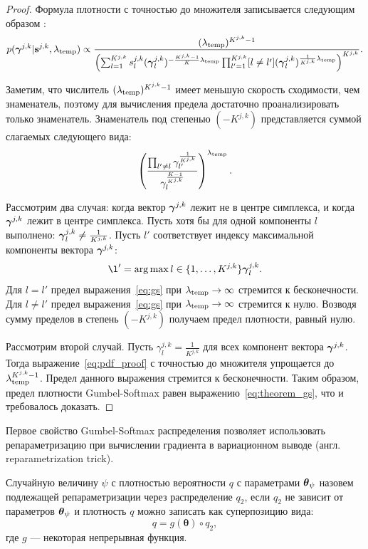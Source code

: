 \begin{proof} 
Формула плотности с точностью до множителя записывается следующим образом :
\begin{equation}
\label{eq:pdf_proof}
    p(\boldsymbol{\gamma}^{j,k}|\mathbf{s}^{j,k}, \lambda_{\text{temp}}) \propto    \frac{(\lambda_{\text{temp}})^{K^{j,k}-1}}{\left(\sum_{l=1}^{K^{j,k}} s^{j,k}_l(\boldsymbol{\gamma}^{j,k}_l)^{-\frac{K^{j,k}-1}{K}\lambda_{\text{temp}}}\prod_{l'=1}^{K^{j,k}} [l \neq l'](\boldsymbol{\gamma}_l^{j,k})^{\frac{1}{K^{j,k}}\lambda_{\text{temp}}}\right)^{K^{j,k}}}.
\end{equation}

Заметим, что числитель $(\lambda_{\text{temp}})^{K^{j,k}-1}$ имеет меньшую скорость сходимости, чем знаменатель, поэтому для вычисления предела достаточно проанализировать только знаменатель. Знаменатель под степенью $(-K^{j,k})$ представляется суммой слагаемых следующего вида: 
\begin{equation}
\label{eq:gs}
    \left(\frac{\prod_{l' \neq l} \gamma_{l'}^{\frac{1}{K^{j,k}}}}{\gamma_l^{\frac{K-1}{K^{j,k}}}}\right)^{\lambda_{\text{temp}}}.
\end{equation}

Рассмотрим два случая: когда вектор $\boldsymbol{\gamma}^{j,k}$  лежит не в центре симплекса, и когда  $\boldsymbol{\gamma}^{j,k}$ лежит в центре симплекса. 
Пусть хотя бы для одной компоненты $l$ выполнено: $\boldsymbol{\gamma}^{j,k}_l \neq \frac{1}{K^{j,k}}$. Пусть $l'$ соответствует индексу максимальной компоненты вектора $\boldsymbol{\gamma}^{j,k}$:
\[
    \l' = \argmax{l \in \{1,\dots,K^{j,k}\}} \g^{j,k}_l.
\]
Для $l=l'$ предел выражения~\eqref{eq:gs} при $\lambda_{\text{temp}} \to \infty$ стремится к бесконечности. Для $l\neq l'$ предел выражения~\eqref{eq:gs} при $\lambda_{\text{temp}} \to \infty$ стремится к нулю. Возводя сумму пределов в степень $(-K^{j,k})$ получаем предел плотности, равный нулю.

Рассмотрим второй случай. Пусть ${\gamma}^{j,k}_l = \frac{1}{K^{j,k}}$ для всех компонент вектора $\boldsymbol{\gamma}^{j,k}$.
Тогда выражение~\eqref{eq:pdf_proof} с точностью до множителя упрощается до $\lambda_{\text{temp}}^{K^{j,k}-1}$. Предел данного выражения стремится к бесконечности.
Таким образом, предел плотности Gumbel-Softmax равен выражению~\eqref{eq:theorem_gs}, что и требовалось доказать.

\end{proof}


Первое свойство Gumbel-Softmax распределения позволяет использовать репараметризацию при вычислении градиента в вариационном выводе (англ. reparametrization trick). 
\begin{defin} Случайную величину  $\psi$ с плотностью вероятности $q$ с параметрами $\boldsymbol{\theta}_\psi$ назовем подлежащей репараметризации через распределение $q_2$, если $q_2$ не зависит от параметров $\boldsymbol{\theta}_{\psi}$ и плотность $q$ можно записать как суперпозицию вида:
\[
   q = g(\boldsymbol{\theta}) \circ q_2,
\]
где  $g$ --- некоторая непрерывная функция.
\end{defin}

